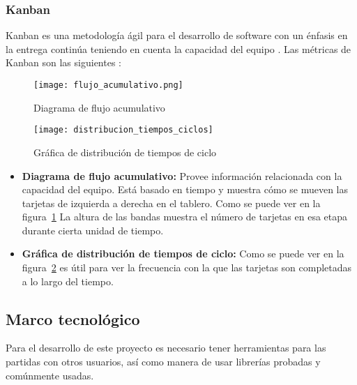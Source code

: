 \subsubsection{Kanban}
Kanban es una metodología ágil para el desarrollo de software con un énfasis 
en la entrega continúa teniendo en cuenta la capacidad del equipo \cite{romano-a}. 
Las métricas de Kanban son las siguientes \cite{najera2018a}:

\begin{figure}[h]
    \centering
    \texttt{[image: flujo\_acumulativo.png]}
        \caption{Diagrama de flujo acumulativo}
    \label{fig:flujo_acumulativo}
\end{figure}

\begin{figure}[h]
    \centering
    \texttt{[image: distribucion\_tiempos\_ciclos]}
    \caption{Gráfica de distribución de tiempos de ciclo}
    \label{fig:distribucion_tiempos_ciclos}
\end{figure}

\begin{itemize}
    \item \textbf{Diagrama de flujo acumulativo:} Provee información relacionada con la capacidad del equipo. Está basado en tiempo y muestra cómo se mueven las tarjetas de izquierda a derecha en el tablero. Como se puede ver en la figura~\ref{fig:flujo_acumulativo} La altura de las bandas muestra el número de tarjetas en esa etapa durante cierta unidad de tiempo.
    \item \textbf{Gráfica de distribución de tiempos de ciclo:} Como se puede ver en la figura~\ref{fig:distribucion_tiempos_ciclos} es útil para ver la frecuencia con la que las tarjetas son completadas a lo largo del tiempo.
\end{itemize}

\subsection{Marco tecnológico}
Para el desarrollo de este proyecto es necesario tener herramientas para las partidas con otros usuarios, así como manera de usar librerías probadas y comúnmente usadas.

